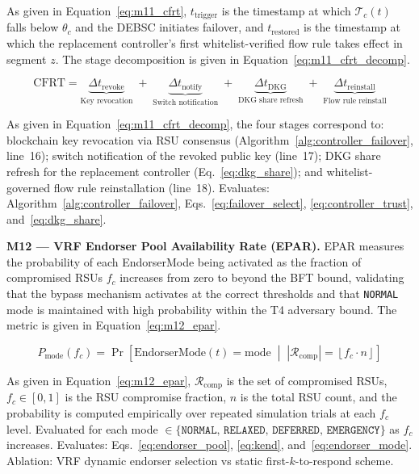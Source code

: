 \documentclass[12pt, a4paper]{report}
\newcommand{\mypar}{\vspace{0.8em}\noindent}
\begin{document}
As given in Equation~\eqref{eq:m11_cfrt}, $t_{\text{trigger}}$ is
the timestamp at which $\mathcal{T}_c(t)$ falls below $\theta_c$ and
the DEBSC initiates failover, and $t_{\text{restored}}$ is the timestamp
at which the replacement controller's first whitelist-verified flow rule
takes effect in segment $z$. The stage decomposition is given in
Equation~\eqref{eq:m11_cfrt_decomp}.

\begin{equation}
\label{eq:m11_cfrt_decomp}
\text{CFRT} =
\underbrace{\Delta t_{\text{revoke}}}_{\text{Key revocation}}
\;+\;
\underbrace{\Delta t_{\text{notify}}}_{\text{Switch notification}}
\;+\;
\underbrace{\Delta t_{\text{DKG}}}_{\text{DKG share refresh}}
\;+\;
\underbrace{\Delta t_{\text{reinstall}}}_{\text{Flow rule reinstall}}
\end{equation}

As given in Equation~\eqref{eq:m11_cfrt_decomp}, the four stages
correspond to: blockchain key revocation via RSU consensus
(Algorithm~\ref{alg:controller_failover}, line~16); switch notification
of the revoked public key (line~17); DKG share refresh for the
replacement controller (Eq.~\eqref{eq:dkg_share}); and
whitelist-governed flow rule reinstallation (line~18). Evaluates:
Algorithm~\ref{alg:controller_failover},
Eqs.~\eqref{eq:failover_select}, \eqref{eq:controller_trust},
and~\eqref{eq:dkg_share}.

\mypar
\textbf{M12 --- VRF Endorser Pool Availability Rate (EPAR).}
EPAR measures the probability of each EndorserMode being activated as
the fraction of compromised RSUs $f_c$ increases from zero to beyond the
BFT bound, validating that the bypass mechanism activates at the correct
thresholds and that \texttt{NORMAL} mode is maintained with high
probability within the T4 adversary bound. The metric is given in
Equation~\eqref{eq:m12_epar}.

\begin{equation}
\label{eq:m12_epar}
P_{\text{mode}}(f_c) =
\Pr\!\left[
\mathrm{EndorserMode}(t) = \text{mode}
\;\middle|\;
|\mathcal{R}_{\text{comp}}| =
\left\lfloor f_c \cdot n \right\rfloor
\right]
\end{equation}

As given in Equation~\eqref{eq:m12_epar}, $\mathcal{R}_{\text{comp}}$
is the set of compromised RSUs, $f_c \in [0,1]$ is the RSU compromise
fraction, $n$ is the total RSU count, and the probability is computed
empirically over repeated simulation trials at each $f_c$ level.
Evaluated for each mode $\in \{\texttt{NORMAL},\,\texttt{RELAXED},\,
\texttt{DEFERRED},\,\texttt{EMERGENCY}\}$ as $f_c$ increases.
Evaluates: Eqs.~\eqref{eq:endorser_pool}, \eqref{eq:kend},
and~\eqref{eq:endorser_mode}. Ablation: VRF dynamic endorser selection
vs static first-$k$-to-respond scheme.
\end{document}
